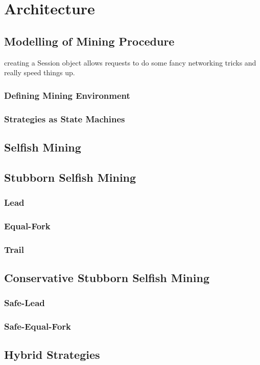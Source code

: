 \chapter{Architecture}
\label{sec:architecture}
\minitoc
\vspace*{1cm}

\section{Modelling of Mining Procedure}
creating a Session object allows requests to do some fancy networking tricks and really speed things up.

\subsection{Defining Mining Environment}

\subsection{Strategies as State Machines}

\section{Selfish Mining}

\section{Stubborn Selfish Mining}

\subsection{Lead}

\subsection{Equal-Fork}

\subsection{Trail}

\section{Conservative Stubborn Selfish Mining}

\subsection{Safe-Lead}

\subsection{Safe-Equal-Fork}

\section{Hybrid Strategies}